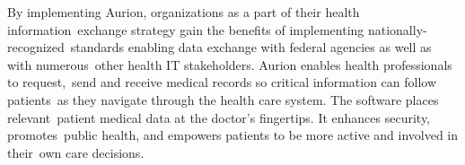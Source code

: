 By implementing Aurion, organizations as a part of their health information\
 exchange strategy gain the benefits of implementing nationally-recognized\
 standards enabling data exchange with federal agencies as well as with numerous\
 other health IT stakeholders. Aurion enables health professionals to request,\
 send and receive medical records so critical information can follow patients\
as they navigate through the health care system. The software places relevant\
 patient medical data at the doctor’s fingertips. It enhances security, promotes\
 public health, and empowers patients to be more active and involved in their\
 own care decisions.\citep{_aurion_software_2013}
